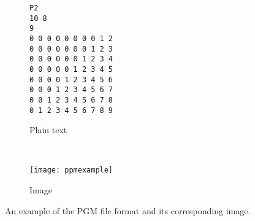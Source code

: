 \begin{figure}[H]
\centering
\begin{subfigure}[b]{0.4\textwidth}
\begin{minipage}{1\textwidth}
\begin{lstlisting}[label = li:ppmformat]
P2
10 8
9
0 0 0 0 0 0 0 0 1 2
0 0 0 0 0 0 0 1 2 3
0 0 0 0 0 0 1 2 3 4
0 0 0 0 0 1 2 3 4 5
0 0 0 0 1 2 3 4 5 6
0 0 0 1 2 3 4 5 6 7
0 0 1 2 3 4 5 6 7 8
0 1 2 3 4 5 6 7 8 9
\end{lstlisting}
\end{minipage}
\caption{
    \tiny Plain text
  }
  \label{fig:ppmplain}
\end{subfigure}
~ %
\begin{subfigure}[b]{0.45\textwidth}
  \centering
  \texttt{[image: ppmexample]}
  \caption{
    \tiny Image
  }
  \label{fig:ppmimage}
\end{subfigure}
\caption{
    An example of the PGM file format and its corresponding image.
}
\end{figure}

